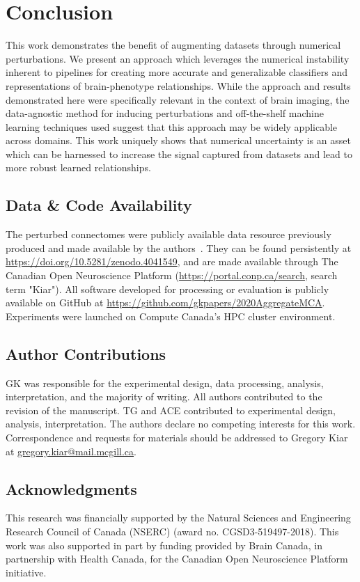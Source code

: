 \documentclass[10pt]{SelfArx} %
\begin{document}
\section*{Conclusion}

This work demonstrates the benefit of augmenting datasets through numerical perturbations. We present an approach which
leverages the numerical instability inherent to pipelines for creating more accurate and generalizable classifiers and
representations of brain-phenotype relationships. While the approach and results demonstrated here were specifically
relevant in the context of brain imaging, the data-agnostic method for inducing perturbations and off-the-shelf machine
learning techniques used suggest that this approach may be widely applicable across domains. This work uniquely shows
that numerical uncertainty is an asset which can be harnessed to increase the signal captured from datasets and
lead to more robust learned relationships.


\subsection*{Data \& Code Availability}
The perturbed connectomes were publicly available data resource previously produced and made available by the
authors~\cite{Kiar2020-yz}. They can be found persistently at \url{https://doi.org/10.5281/zenodo.4041549}, and are
made available through The Canadian Open Neuroscience Platform (\url{https://portal.conp.ca/search}, search term
"Kiar"). All software developed for processing or evaluation is publicly available on GitHub at
\url{https://github.com/gkpapers/2020AggregateMCA}. Experiments were launched on Compute Canada's HPC cluster
environment. 

\subsection*{Author Contributions}
GK was responsible for the experimental design, data processing, analysis, interpretation, and the majority of writing.
All authors contributed to the revision of the manuscript. TG and ACE contributed to experimental design, analysis,
interpretation. The authors declare no competing interests for this work. Correspondence and requests for materials
should be addressed to Gregory Kiar at \url{gregory.kiar@mail.mcgill.ca}.

\subsection*{Acknowledgments} 
This research was financially supported by the Natural Sciences and Engineering Research Council of Canada (NSERC)
(award no. CGSD3-519497-2018). This work was also supported in part by funding provided by Brain Canada, in partnership
with Health Canada, for the Canadian Open Neuroscience Platform initiative.



\end{document}
